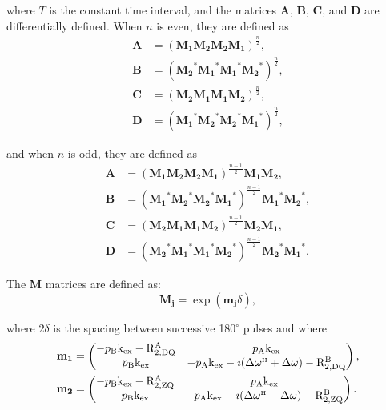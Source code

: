 where $T$ is the constant time interval, and the matrices $\mathbf{A}$, $\mathbf{B}$, $\mathbf{C}$, and $\mathbf{D}$ are differentially defined.
When $n$ is even, they are defined as 
\begin{subequations}
\begin{align}
    \mathbf{A} &= \left( \mathbf{M_1} \mathbf{M_2} \mathbf{M_2} \mathbf{M_1} \right)^{\frac{n}{2}}, \\
    \mathbf{B} &= \left( \mathbf{M_2}^* \mathbf{M_1}^* \mathbf{M_1}^* \mathbf{M_2}^* \right)^{\frac{n}{2}}, \\
    \mathbf{C} &= \left( \mathbf{M_2} \mathbf{M_1} \mathbf{M_1} \mathbf{M_2} \right)^{\frac{n}{2}}, \\
    \mathbf{D} &= \left( \mathbf{M_1}^* \mathbf{M_2}^* \mathbf{M_2}^* \mathbf{M_1}^* \right)^{\frac{n}{2}},
\end{align}
\end{subequations}

and when $n$ is odd, they are defined as
\begin{subequations}
\begin{align}
    \mathbf{A} &= \left( \mathbf{M_1} \mathbf{M_2} \mathbf{M_2} \mathbf{M_1} \right)^{\frac{n-1}{2}} \mathbf{M_1} \mathbf{M_2}, \\
    \mathbf{B} &= \left( \mathbf{M_1}^* \mathbf{M_2}^* \mathbf{M_2}^* \mathbf{M_1}^* \right)^{\frac{n-1}{2}} \mathbf{M_1}^* \mathbf{M_2}^*, \\
    \mathbf{C} &= \left( \mathbf{M_2} \mathbf{M_1} \mathbf{M_1} \mathbf{M_2} \right)^{\frac{n-1}{2}} \mathbf{M_2} \mathbf{M_1}, \\
    \mathbf{D} &= \left( \mathbf{M_2}^* \mathbf{M_1}^* \mathbf{M_1}^* \mathbf{M_2}^* \right)^{\frac{n-1}{2}} \mathbf{M_2}^* \mathbf{M_1}^*.
\end{align}
\end{subequations}

The $\mathbf{M}$ matrices are defined as:
\begin{equation}
    \mathbf{M_j} = \exp(\mathbf{m_j}\delta),
\end{equation}

where $2\delta$ is the spacing between successive 180$^\circ$ pulses and where
\begin{subequations}
\begin{align}
    \mathbf{m_1} &= \begin{pmatrix}
                        -p_\textrm{B}\textrm{k}_\textrm{ex} - \mathrm{R}_\mathrm{2,DQ}^\mathrm{A} & p_\textrm{A}\textrm{k}_\textrm{ex} \\
                        p_\textrm{B}\textrm{k}_\textrm{ex} & - p_\textrm{A}\textrm{k}_\textrm{ex} -\imath(\Delta\omega^{\scriptscriptstyle\mathrm{H}} + \Delta\omega) - \mathrm{R}_\mathrm{2,DQ}^\mathrm{B} 
                    \end{pmatrix}, \\
    \mathbf{m_2} &=  \begin{pmatrix}
                        -p_\textrm{B}\textrm{k}_\textrm{ex} - \mathrm{R}_\mathrm{2,ZQ}^\mathrm{A} & p_\textrm{A}\textrm{k}_\textrm{ex} \\
                        p_\textrm{B}\textrm{k}_\textrm{ex} & - p_\textrm{A}\textrm{k}_\textrm{ex} -\imath(\Delta\omega^{\scriptscriptstyle\mathrm{H}} - \Delta\omega) - \mathrm{R}_\mathrm{2,ZQ}^\mathrm{B} 
                    \end{pmatrix}.
\end{align}
\end{subequations}

